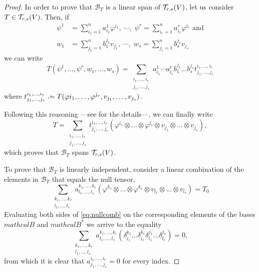 \begin{proof}

	In order to prove that $\mathcal{B}_T$ is a linear span of ${\mathcal T}_{r,s}(V)$, let us consider $T\in{\mathcal T}_{r,s}(V)$. Then, if
	\begin{align*}
		\psi^1& = \sum_{i_1 = 1}^n a_{i_1}^1 \varphi^{i_1},\; \cdots,\; \psi^r = \sum_{i_r = 1}^n a_{i_r}^r \varphi^{i_r} \textrm{ and} \\
		w_1 &= \sum_{j_1 = 1}^n b^{j_1}_1 v_{j_1},\; \cdots,\; w_s = \sum_{j_s = 1}^n b^{j_s}_s v_{j_s}
	\end{align*}
	we can write
	\[
		T(\psi^1, \dots, \psi^r, w_1, \dots, w_s) = \sum_{\substack{i_1,\dots,i_r\\j_1,\dots,j_s}} a_{i_1}^1 \cdots a_{i_r}^r b^{j_1}_1 \dots b^{j_s}_s t_{j_1, \dots, j_r}^{i_1, \dots, i_r}
	\]
	where $t_{j_1, \dots, j_r}^{i_1, \dots, i_r} \defeq T(\varphi{i_1}, \dots, \varphi^{j_r}, v_{j_1}, \dots, v_{j_s})$.
	
	Following this reasoning ---see \cite{romero86} for the details---, we can finally write
	\[
		T = \sum_{\substack{i_1,\dots,i_r\\j_1,\dots,j_s}} t_{j_1, \dots, j_r}^{i_1, \dots, i_r} \left( \varphi^{i_1} \otimes \dots \otimes \varphi^{i_r} \otimes v_{j_1} \otimes \dots \otimes v_{j_s} \right),
	\]
	which proves that $\mathcal{B}_T$ spans ${\mathcal T}_{r,s}(V)$.
	
	To prove that $\mathcal{B}_T$ is linearly independent, consider a linear combination of the elements in $\mathcal{B}_T$ that equals the null tensor,
	\begin{equation}
		\label{eq:nullcomb}
		\sum_{\substack{k_1,\dots,k_r\\l_1,\dots,l_s}} a^{k_1,\dots,k_r}_{l_1,\dots,l_s} \left( \varphi^{k_1} \otimes \dots \otimes \varphi^{k_r} \otimes v_{l_1} \otimes \dots \otimes v_{l_s} \right) = T_0
	\end{equation}
	Evaluating both sides of \autoref{eq:nullcomb} on the corresponding elements of the bases $mathcal{B}$ and $mathcal{B^*}$ we arrive to the equality
	\[
		\sum_{\substack{k_1,\dots,k_r\\l_1,\dots,l_s}} a^{k_1,\dots,k_r}_{l_1,\dots,l_s} \left( \delta_{i_1}^{k_1} \dots \delta_{i_r}^{k_r} \delta_{l_1}^{j_1} \dots \delta_{l_s}^{j_s} \right) = 0,
	\]
	from which it is clear that $a^{i_1,\dots,i_r}_{j_1,\dots,j_s} = 0$ for every index.
\end{proof}

